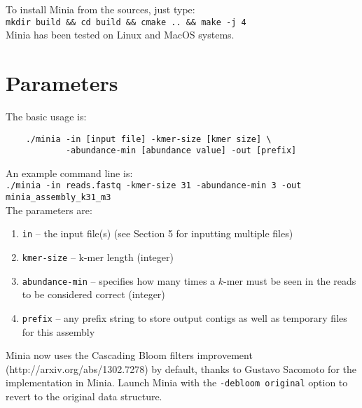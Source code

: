 \documentclass[a4paper]{article}
\begin{document}
To install Minia from the sources, just type: \\ \verb+mkdir build && cd build && cmake .. && make -j 4+ \\
Minia has been tested on Linux and MacOS systems.

\section{Parameters}

The basic usage is:\\

\begin{verbatim}
    ./minia -in [input file] -kmer-size [kmer size] \
            -abundance-min [abundance value] -out [prefix]
\end{verbatim}


An example command line is:\\


\verb+./minia -in reads.fastq -kmer-size 31 -abundance-min 3 -out minia_assembly_k31_m3+\\

The parameters are:

\begin{enumerate}

    \item \verb+in+ -- the input file(s) (see Section 5 for inputting multiple files)

    \item \verb+kmer-size+  -- k-mer length (integer)

    \item \verb+abundance-min+ -- specifies how many times a $k$-mer must be seen in the reads to be considered correct (integer)

\item \verb+prefix+ -- any prefix string to store output contigs as well as temporary files for this assembly

\end{enumerate}

Minia now uses the Cascading Bloom filters improvement (http://arxiv.org/abs/1302.7278) by default, thanks to Gustavo Sacomoto for the implementation in Minia. Launch Minia with the \verb!-debloom original! option to revert to the original data structure.
\end{document}
